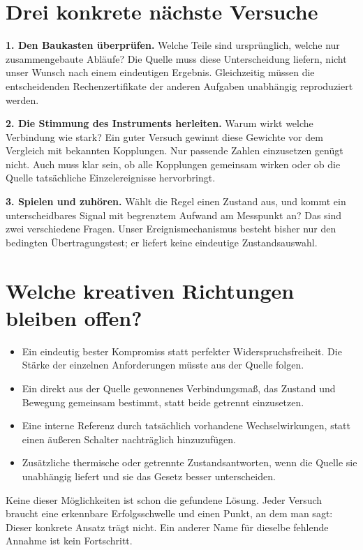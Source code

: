 \clearpage
\section*{Drei konkrete nächste Versuche}
\textbf{1. Den Baukasten überprüfen.}
Welche Teile sind ursprünglich, welche nur zusammengebaute Abläufe?
Die Quelle muss diese Unterscheidung liefern, nicht unser Wunsch nach
einem eindeutigen Ergebnis. Gleichzeitig müssen die entscheidenden
Rechenzertifikate der anderen Aufgaben unabhängig reproduziert werden.

\textbf{2. Die Stimmung des Instruments herleiten.}
Warum wirkt welche Verbindung wie stark? Ein guter Versuch gewinnt diese
Gewichte vor dem Vergleich mit bekannten Kopplungen. Nur passende Zahlen
einzusetzen genügt nicht. Auch muss klar sein, ob alle Kopplungen gemeinsam
wirken oder ob die Quelle tatsächliche Einzelereignisse hervorbringt.

\textbf{3. Spielen und zuhören.}
Wählt die Regel einen Zustand aus, und kommt ein unterscheidbares Signal
mit begrenztem Aufwand am Messpunkt an? Das sind zwei verschiedene Fragen.
Unser Ereignismechanismus besteht bisher nur den bedingten Übertragungstest;
er liefert keine eindeutige Zustandsauswahl.

\section*{Welche kreativen Richtungen bleiben offen?}
\begin{itemize}
\item Ein eindeutig bester Kompromiss statt perfekter Widerspruchsfreiheit.
Die Stärke der einzelnen Anforderungen müsste aus der Quelle folgen.
\item Ein direkt aus der Quelle gewonnenes Verbindungsmaß, das Zustand
und Bewegung gemeinsam bestimmt, statt beide getrennt einzusetzen.
\item Eine interne Referenz durch tatsächlich vorhandene Wechselwirkungen,
statt einen äußeren Schalter nachträglich hinzuzufügen.
\item Zusätzliche thermische oder getrennte Zustandsantworten, wenn die
Quelle sie unabhängig liefert und sie das Gesetz besser unterscheiden.
\end{itemize}
Keine dieser Möglichkeiten ist schon die gefundene Lösung. Jeder Versuch
braucht eine erkennbare Erfolgsschwelle und einen Punkt, an dem man sagt:
Dieser konkrete Ansatz trägt nicht. Ein anderer Name für dieselbe fehlende
Annahme ist kein Fortschritt.

